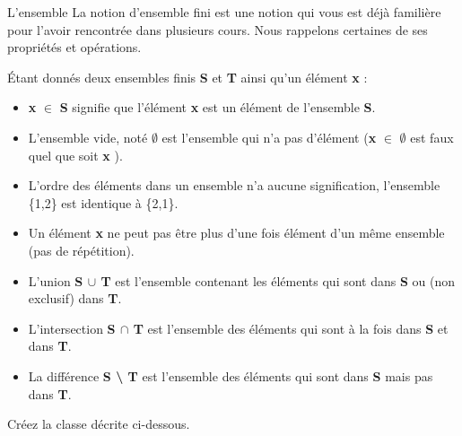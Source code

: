 \begin{Exercice}{L'ensemble}
		La notion d’ensemble fini est une notion qui vous est déjà 
		familière pour l’avoir rencontrée dans plusieurs cours. Nous rappelons
		certaines de ses propriétés et opérations. 
		
		\bigskip
		
		Étant donnés deux ensembles
		finis \textbf{S} et \textbf{T} ainsi qu’un élément \textbf{x} :

		\liststyleListv
		\begin{itemize}
		\item 
			\textbf{x} {${\in}$} \textbf{S} signifie que l’élément \textbf{x}
			est un élément de l’ensemble \textbf{S}.
		\item 
			L’ensemble vide, noté \textbf{${\emptyset}$} 
			est l’ensemble qui n’a pas d’élément 
			(\textbf{x} {${\in}$} \textbf{${\emptyset}$} 
			est faux quel que soit \textbf{x} ).
		\item 
			L’ordre des éléments dans un ensemble n’a
			aucune signification, l’ensemble \{1,2\} est
			identique à \{2,1\}.
		\item 
			Un élément \textbf{x} ne peut
			pas être plus d’une fois élément d’un même ensemble 
			(pas de répétition).
		\item 
			L’union \textbf{S ${\cup}$ T} 
			est l’ensemble contenant les éléments qui sont dans 
			\textbf{S} ou (non exclusif) dans \textbf{T}.
		\item 
			L’intersection \textbf{S ${\cap}$ T} 
			est l’ensemble des éléments qui sont à la fois 
			dans \textbf{S} et dans \textbf{T}.
		\item 
			La différence \textbf{S {\textbackslash} T} 
			est l’ensemble des éléments qui sont 
			dans \textbf{S} mais pas dans \textbf{T}.
		\end{itemize}
		
		\bigskip
		
		Créez la classe 
		décrite ci-dessous.
		
	\bigskip


\end{Exercice}
